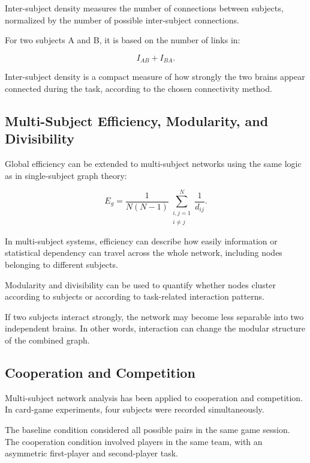 Inter-subject density measures the number of connections between subjects, normalized by the number of possible inter-subject connections.

For two subjects A and B, it is based on the number of links in:

\[
I_{AB} + I_{BA}.
\]

\begin{authornote}
Inter-subject density is a compact measure of how strongly the two brains appear connected during the task, according to the chosen connectivity method.
\end{authornote}

\subsection{Multi-Subject Efficiency, Modularity, and Divisibility}

Global efficiency can be extended to multi-subject networks using the same logic as in single-subject graph theory:

\[
E_g =
\frac{1}{N(N-1)}
\sum_{\substack{i,j=1 \\ i \neq j}}^{N}
\frac{1}{d_{ij}}.
\]

In multi-subject systems, efficiency can describe how easily information or statistical dependency can travel across the whole network, including nodes belonging to different subjects.

Modularity and divisibility can be used to quantify whether nodes cluster according to subjects or according to task-related interaction patterns.

\begin{authornote}
If two subjects interact strongly, the network may become less separable into two independent brains. In other words, interaction can change the modular structure of the combined graph.
\end{authornote}

\subsection{Cooperation and Competition}

Multi-subject network analysis has been applied to cooperation and competition. In card-game experiments, four subjects were recorded simultaneously.

The baseline condition considered all possible pairs in the same game session. The cooperation condition involved players in the same team, with an asymmetric first-player and second-player task.

